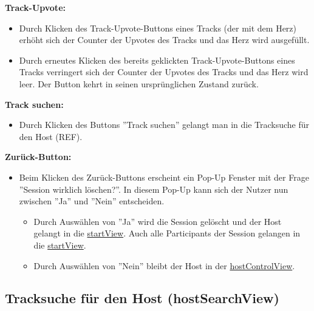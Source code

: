 \documentclass[oneside, ngerman]{sdqtechreport}
\begin{document}
\textbf{Track-Upvote:}
\begin{itemize}
    \item Durch Klicken des Track-Upvote-Buttons eines Tracks (der mit dem Herz) erhöht sich der Counter der Upvotes des Tracks und das Herz wird ausgefüllt.
    \item Durch erneutes Klicken des bereits geklickten Track-Upvote-Buttons eines Tracks verringert sich der Counter der Upvotes des Tracks und das Herz wird leer. Der Button kehrt in seinen ursprünglichen Zustand zurück.
\end{itemize}

\textbf{Track suchen:}
\begin{itemize}
    \item Durch Klicken des Buttons ''Track suchen'' gelangt man in die Tracksuche für den Host (REF).
\end{itemize}

\textbf{Zurück-Button:}
\begin{itemize}
    \item Beim Klicken des Zurück-Buttons erscheint ein Pop-Up Fenster mit der Frage ''Session wirklich löschen?''. In diesem Pop-Up kann sich der Nutzer nun zwischen ''Ja'' und ''Nein'' entscheiden.
    \begin{itemize}
        \item Durch Auswählen von ''Ja'' wird die Session gelöscht und der Host gelangt in die \hyperlink{startView}{startView}. Auch alle Participants der Session gelangen in die \hyperlink{startView}{startView}.
        \item Durch Auswählen von ''Nein'' bleibt der Host in der \hyperlink{hostControlView}{hostControlView}.
    \end{itemize}
\end{itemize}

\subsection{Tracksuche für den Host (hostSearchView)}
\label{sec:Benutzeroberfläche:joinSessionView}
\end{document}
